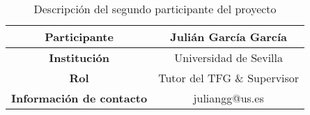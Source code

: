 \begin{table}[H]
    \centering
    \begin{tabular}{|c|c|}
    \hline
    \textbf{Participante} & Julián García García \\
    \hline
    \textbf{Institución} & Universidad de Sevilla \\
    \hline
    \textbf{Rol} & Tutor del TFG \& Supervisor \\
    \hline
    \textbf{Información de contacto} & juliangg@us.es \\
    \hline
    \end{tabular}
\caption{Descripción del segundo participante del proyecto}
\label{tab:segundoParticipante}
\end{table}